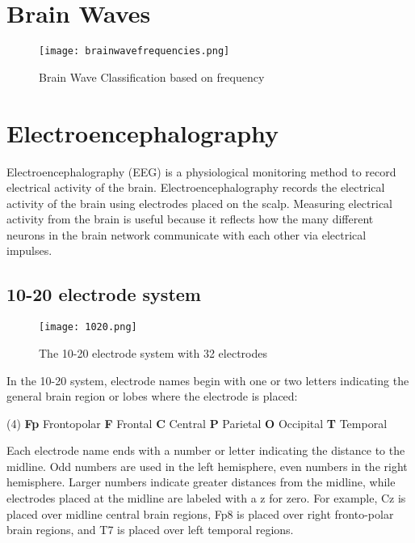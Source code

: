 \section{Brain Waves}
\begin{figure}[H]
\centering
\texttt{[image: brainwavefrequencies.png]}
\caption{Brain Wave Classification based on frequency}
\label{fig-1-1}
\end{figure}

\section{Electroencephalography}

Electroencephalography (EEG) is a physiological monitoring method to record electrical activity of the brain. Electroencephalography records the electrical activity of the brain using electrodes placed on the scalp. Measuring electrical activity from the brain is useful because it reflects how the many different neurons in the brain network communicate with each other via electrical impulses.

\subsection{10-20 electrode system}
\begin{figure}[H]
\centering
\texttt{[image: 1020.png]}
\caption{The 10-20 electrode system with 32 electrodes}
\label{fig-1-2}
\end{figure}

In the 10-20 system, electrode names begin with one or two letters indicating the general brain region or lobes where the electrode is placed:

\bfseries \normalfont
\begin{tasks}[label-align=left, label-offset={0mm}, label-width={5mm}, item-indent={5mm}, label-format={\bfseries}, column-sep=10mm](4)
\task \textbf{Fp} Frontopolar
\task \textbf{F} Frontal
\task \textbf{C} Central
\task \textbf{P} Parietal
\task \textbf{O} Occipital
\task \textbf{T} Temporal
\end{tasks}

Each electrode name ends with a number or letter indicating the distance to the midline. Odd numbers are used in the left hemisphere, even numbers in the right hemisphere. Larger numbers indicate greater distances from the midline, while electrodes placed at the midline are labeled with a z for zero. For example, Cz is placed over midline central brain regions, Fp8 is placed over right fronto-polar brain regions, and T7 is placed over left temporal regions.
